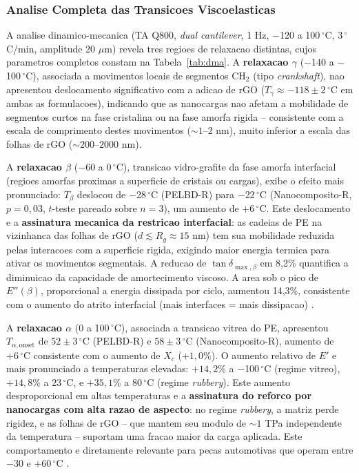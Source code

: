 \documentclass[11pt,a4paper,oneside]{article}
\begin{document}
\subsubsection{Analise Completa das Transicoes Viscoelasticas}

A analise dinamico-mecanica (TA Q800, \textit{dual cantilever}, 1 Hz, $-$120 a 100$\,^{\circ}$C, 3$\,^{\circ}$C/min, amplitude 20 $\mu$m) revela tres regioes de relaxacao distintas, cujos parametros completos constam na Tabela~\ref{tab:dma}. A {\bfseries relaxacao $\gamma$} ($-$140 a $-$100$\,^{\circ}$C), associada a movimentos locais de segmentos CH$_2$ (tipo \textit{crankshaft}), nao apresentou deslocamento significativo com a adicao de rGO ($T_\gamma{\approx}{-}118{\pm}2\,^{\circ}$C em ambas as formulacoes), indicando que as nanocargas nao afetam a mobilidade de segmentos curtos na fase cristalina ou na fase amorfa rigida -- consistente com a escala de comprimento destes movimentos (${\sim}1$--$2$ nm), muito inferior a escala das folhas de rGO (${\sim}200$--$2000$ nm).

A {\bfseries relaxacao $\beta$} ($-$60 a 0$\,^{\circ}$C), transicao vidro-grafite da fase amorfa interfacial (regioes amorfas proximas a superficie de cristais ou cargas), exibe o efeito mais pronunciado: $T_\beta$ deslocou de $-$28$\,^{\circ}$C (PELBD-R) para $-$22$\,^{\circ}$C (Nanocomposito-R, $p{=}0{,}03$, $t$-teste pareado sobre $n{=}3$), um aumento de $+6\,^{\circ}$C. Este deslocamento e a {\bfseries assinatura mecanica da restricao interfacial}: as cadeias de PE na vizinhanca das folhas de rGO ($d{\lesssim}R_g{\approx}15$ nm) tem sua mobilidade reduzida pelas interacoes com a superficie rigida, exigindo maior energia termica para ativar os movimentos segmentais. A reducao de $\tan\delta_{\max,\beta}$ em 8,2\% quantifica a diminuicao da capacidade de amortecimento viscoso. A area sob o pico de $E''(\beta)$, proporcional a energia dissipada por ciclo, aumentou 14,3\%, consistente com o aumento do atrito interfacial (mais interfaces = mais dissipacao) \cite{Menard2020}.

A {\bfseries relaxacao $\alpha$} (0 a 100$\,^{\circ}$C), associada a transicao vitrea do PE, apresentou $T_{\alpha,\text{onset}}$ de $52{\pm}3\,^{\circ}$C (PELBD-R) e $58{\pm}3\,^{\circ}$C (Nanocomposito-R), aumento de $+6\,^{\circ}$C consistente com o aumento de $X_c$ ($+1{,}0\%$). O aumento relativo de $E'$ e mais pronunciado a temperaturas elevadas: $+14{,}2\%$ a $-$100$\,^{\circ}$C (regime vitreo), $+14{,}8\%$ a 23$\,^{\circ}$C, e $+35{,}1\%$ a 80$\,^{\circ}$C (regime \textit{rubbery}). Este aumento desproporcional em altas temperaturas e a {\bfseries assinatura do reforco por nanocargas com alta razao de aspecto}: no regime \textit{rubbery}, a matriz perde rigidez, e as folhas de rGO -- que mantem seu modulo de ${\sim}1$ TPa independente da temperatura -- suportam uma fracao maior da carga aplicada. Este comportamento e diretamente relevante para pecas automotivas que operam entre $-$30 e $+60\,^{\circ}$C \cite{Menard2020}.
\end{document}
